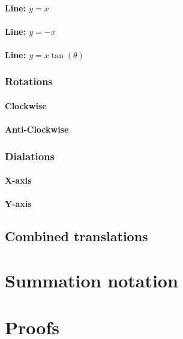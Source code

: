 \documentclass{book}
\begin{document}
\subsubsection{Line: $y = x$}

\subsubsection{Line: $y = -x$}

\subsubsection{Line: $y = x \tan(\theta)$}

\subsection{Rotations}
\subsubsection{Clockwise}

\subsubsection{Anti-Clockwise}

\subsection{Dialations}
\subsubsection{X-axis}

\subsubsection{Y-axis}

\section{Combined translations}



\chapter{Summation notation}



\chapter{Proofs}
\end{document}
